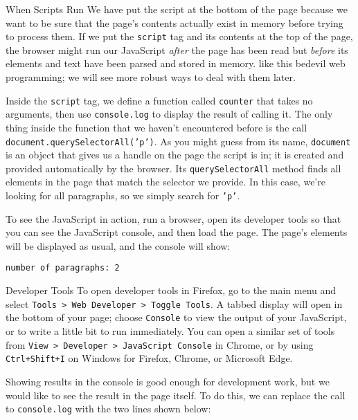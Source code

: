 \begin{aside}{When Scripts Run}
  We have put the script at the bottom of the page
  because we want to be sure that the page's contents actually exist in memory
  before trying to process them.
  If we put the \texttt{script} tag and its contents at the top of the page,
  the browser might run our JavaScript \emph{after} the page has been read
  but \emph{before} its elements and text have been parsed and stored in memory.
   like this bedevil web programming;
  we will see more robust ways to deal with them later.
\end{aside}

Inside the \texttt{script} tag,
we define a function called \texttt{counter} that takes no arguments,
then use \texttt{console.log} to display the result of calling it.
The only thing inside the function that we haven't encountered before
is the call \texttt{document.querySelectorAll('p')}.
As you might guess from its name,
\texttt{document} is an object that gives us a handle on the page the script is in;
it is created and provided automatically by the browser.
Its \texttt{querySelectorAll} method finds all elements in the page
that match the selector we provide.
In this case,
we're looking for all paragraphs,
so we simply search for \texttt{'p'}.

To see the JavaScript in action,
run a browser,
open its developer tools so that you can see the JavaScript console,
and then load the page.
The page's elements will be displayed as usual,
and the console will show:

\begin{verbatim}
number of paragraphs: 2
\end{verbatim}

\begin{aside}{Developer Tools}
  To open developer tools in Firefox,
  go to the main menu and select \texttt{Tools {\textgreater} Web\ Developer {\textgreater} Toggle\ Tools}.
  A tabbed display will open in the bottom of your page;
  choose \texttt{Console} to view the output of your JavaScript,
  or to write a little bit to run immediately.
  You can open a similar set of tools from \texttt{View {\textgreater} Developer {\textgreater} JavaScript\ Console} in Chrome,
  or by using \texttt{Ctrl+Shift+I} on Windows for Firefox, Chrome, or Microsoft Edge.
\end{aside}

Showing results in the console is good enough for development work,
but we would like to see the result in the page itself.
To do this,
we can replace the call to \texttt{console.log} with the two lines shown below:

